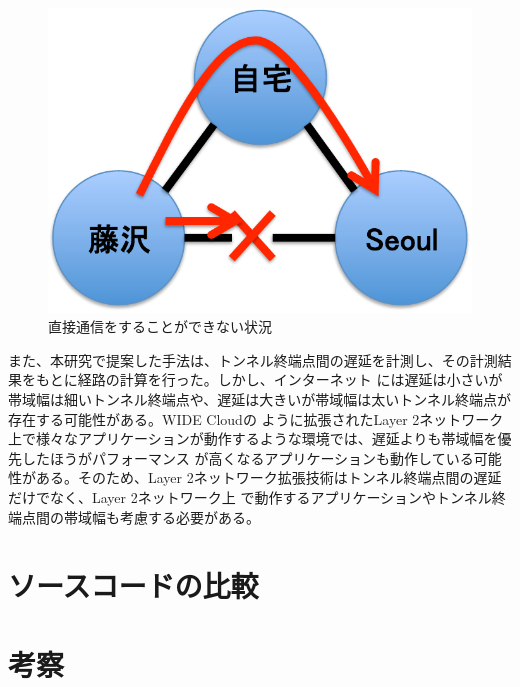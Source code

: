 \begin{figure}
	\begin{center}
		\includegraphics[scale=0.60]{./img/tenbou1}
		\caption{直接通信をすることができない状況}
		\label{img:tenbou1}
	\end{center}
\end{figure}

また、本研究で提案した手法は、トンネル終端点間の遅延を計測し、その計測結果をもとに経路の計算を行った。しかし、インターネット
には遅延は小さいが帯域幅は細いトンネル終端点や、遅延は大きいが帯域幅は太いトンネル終端点が存在する可能性がある。WIDE Cloudの
ように拡張されたLayer 2ネットワーク上で様々なアプリケーションが動作するような環境では、遅延よりも帯域幅を優先したほうがパフォーマンス
が高くなるアプリケーションも動作している可能性がある。そのため、Layer 2ネットワーク拡張技術はトンネル終端点間の遅延だけでなく、Layer 2ネットワーク上
で動作するアプリケーションやトンネル終端点間の帯域幅も考慮する必要がある。

\section{ソースコードの比較}

\section{考察}

